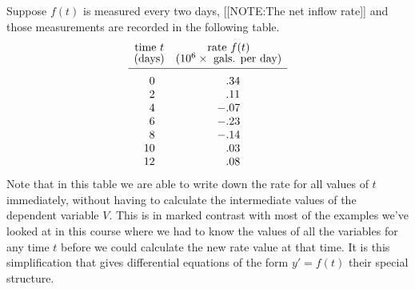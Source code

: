         Suppose $f(t)$ is measured every two days, 
        [[NOTE:The net inflow rate]]
and those measurements are recorded in the following table.
        \addtolength{\arraycolsep}{10pt}
        {\small
        \[
\begin{array}{cc}
        \mbox{time $t$} & \mbox{rate $f(t)$} \\ [-2pt]
        \mbox{(days)} & (10^6 \times \ \mbox{gals. per day}) 
                \\ [2pt] \hline
        \begin{array}{r}
        \rule{0pt}{14pt} 0 \\ 2 \\ 4 \\ 6 \\ 8 \\ 10 \\ 12 
        \end{array}
        &
        \begin{array}{r}
        \rule{0pt}{14pt} .34 \\ .11 \\ -.07 \\ -.23 \\ -.14 \\
                .03 \\ .08 
        \end{array}
\end{array}
\]
}\addtolength{\arraycolsep}{-10pt}%
Note that in this table we are able to write down the rate for all
values of $t$ immediately, without having to calculate the
intermediate values of the dependent variable $V$.  This is in marked
contrast with most of the examples we've looked at in this course
where we had to know the values of all the variables for any time $t$
before we could calculate the new rate value at that time.  It is this
simplification that gives differential equations of the form $y' =
f(t)$ their special structure.

